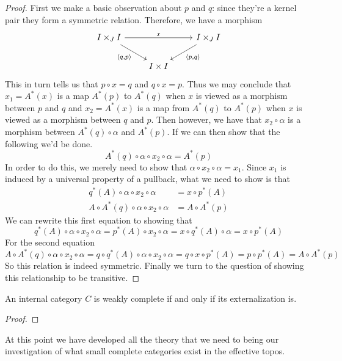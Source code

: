 \begin{proof}
  First we make a
  basic observation about $p$ and $q$: since they're a kernel pair
  they form a symmetric relation. Therefore, we have a morphism
  \[
    \begin{tikzcd}
      I \times_J I \ar[dr, swap, "{\langle q, p \rangle}"] \ar[rr, "x"] &&
      I \times_J I \ar[dl, "{\langle p, q \rangle}"]\\
      & I \times I &
    \end{tikzcd}
  \]
  This in turn tells us that $p \circ x = q$ and $q \circ x = p$. Thus
  we may conclude that $x_1 = A^*(x)$ is a map $A^*(p)$ to $A^*(q)$
  when $x$ is viewed as a morphism between $p$ and $q$ and
  $x_2 = A^*(x)$ is a map from $A^*(q)$ to $A^*(p)$ when $x$ is viewed
  as a morphism between $q$ and $p$. Then however, we have that
  $x_2 \circ \alpha$ is a morphism between $A^*(q) \circ \alpha$ and
  $A^*(p)$. If we can then show that the following we'd be done.
  \[
    A^*(q) \circ \alpha \circ x_2 \circ \alpha = A^*(p)
  \]
  In order to do this, we merely need to show that
  $\alpha \circ x_2 \circ \alpha = x_1$. Since $x_1$ is induced by a
  universal property of a pullback, what we need to show is that
  \begin{align*}
    q^*(A) \circ \alpha \circ x_2 \circ \alpha &= x \circ p^*(A)\\
    A \circ A^*(q) \circ \alpha \circ x_2 \circ \alpha &= A \circ A^*(p)
  \end{align*}
  We can rewrite this first equation to showing that
  \[
    q^*(A) \circ \alpha \circ x_2 \circ \alpha =
    p^*(A) \circ x_2 \circ \alpha =
    x \circ q^*(A) \circ \alpha =
    x \circ p^*(A)
  \]
  For the second equation
  \[
    A \circ A^*(q) \circ \alpha \circ x_2 \circ \alpha =
    q \circ q^*(A) \circ \alpha \circ x_2 \circ \alpha =
    q \circ x \circ p^*(A) =
    p \circ p^*(A) =
    A \circ A^*(p)
  \]
  So this relation is indeed symmetric. Finally we turn to the
  question of showing this relationship to be transitive.
\end{proof}

\begin{thm}\label{thm:complete:completeexternalization}
  An internal category $C$ is weakly complete if and only if its
  externalization is.
\end{thm}
\begin{proof}

\end{proof}
At this point we have developed all the theory that we need to being
our investigation of what small complete categories exist in the
effective topos.

